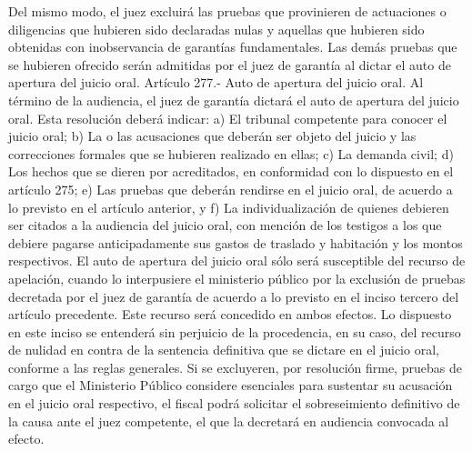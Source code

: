     Del mismo modo, el juez excluirá las pruebas que provinieren de actuaciones o diligencias que hubieren sido declaradas nulas y aquellas que hubieren sido obtenidas con inobservancia de garantías fundamentales.
    Las demás pruebas que se hubieren ofrecido serán admitidas por el juez de garantía al dictar el auto de apertura del juicio oral.
    Artículo 277.- Auto de apertura del juicio oral. Al término de la audiencia, el juez de garantía dictará el auto de apertura del juicio oral. Esta resolución deberá indicar:
    a) El tribunal competente para conocer el juicio
oral;
    b) La o las acusaciones que deberán ser objeto del
juicio y las correcciones formales que se hubieren
realizado en ellas;
    c) La demanda civil;
    d) Los hechos que se dieren por acreditados, en
conformidad con lo dispuesto en el artículo 275;
    e) Las pruebas que deberán rendirse en el juicio
oral, de acuerdo a lo previsto en el artículo anterior,
y
    f) La individualización de quienes debieren ser
citados a la audiencia del juicio oral, con mención de
los testigos a los que debiere pagarse anticipadamente
sus gastos de traslado y habitación y los montos
respectivos.
    El auto de apertura del juicio oral sólo será
susceptible del recurso de apelación, cuando lo
interpusiere el ministerio público por la exclusión de
pruebas decretada por el juez de garantía de acuerdo a
lo previsto en el inciso tercero del artículo
precedente. Este recurso será concedido en ambos
efectos. Lo dispuesto en este inciso se entenderá sin
perjuicio de la procedencia, en su caso, del recurso de
nulidad en contra de la sentencia definitiva que se
dictare en el juicio oral, conforme a las reglas
generales.
    Si se excluyeren, por resolución firme, pruebas de
cargo que el Ministerio Público considere esenciales
para sustentar su acusación en el juicio oral
respectivo, el fiscal podrá solicitar el sobreseimiento
definitivo de la causa ante el juez competente, el que
la decretará en audiencia convocada al efecto.

